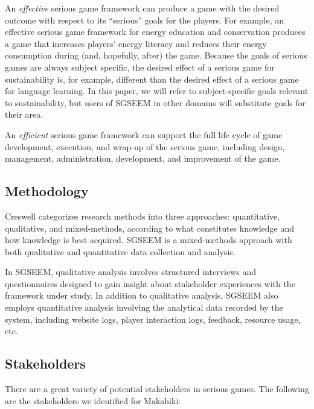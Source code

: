 \documentclass{sigchi}
\begin{document}
An \emph{effective} serious game framework can produce a game with the desired outcome
with respect to its ``serious'' goals for the players. For example, an effective serious
game framework for energy education and conservation produces a game that increases
players' energy literacy and reduces their energy consumption during (and, hopefully,
after) the game. Because the goals of serious games are always subject specific, the
desired effect of a serious game for sustainability is, for example, different than the desired effect
of a serious game for language learning.  In this paper, we will 
refer to subject-specific goals relevant to sustainability, but users of SGSEEM in other
domains will substitute goals for their area. 

An \emph{efficient} serious game framework can support the
full life cycle of game development, execution, and wrap-up of the
serious game, including design, management, administration, development,
and improvement of the game.

\subsection{Methodology}

Creswell \cite{creswell2003} categorizes research methods into three approaches:
quantitative, qualitative, and mixed-methods, according to what constitutes knowledge and
how knowledge is best acquired. SGSEEM is a mixed-methods approach with both qualitative
and quantitative data collection and analysis.

In SGSEEM, qualitative analysis involves structured interviews and questionnaires 
designed to gain insight about stakeholder experiences with the framework under
study. In addition to qualitative analysis, SGSEEM also employs quantitative analysis involving
the analytical data recorded by the system, including website logs, player interaction
logs, feedback, resource usage, etc.

\subsection{Stakeholders}

There are a great variety of potential stakeholders in serious games.
The following are the stakeholders we identified for Makahiki:
\end{document}
